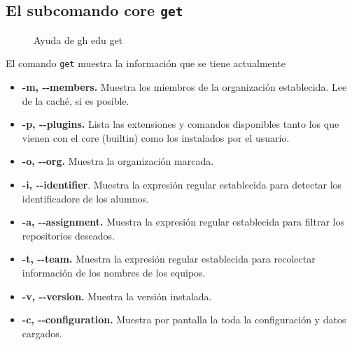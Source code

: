\subsection{El subcomando core {\tt get}}
\begin{figure}
    \centering
    \caption{Ayuda de gh edu get}
    \label{fig:ghEduGetHelp}
\end{figure}
El comando \verb|get| muestra la información que se tiene actualmente
\begin{itemize}
    \item \textbf{-m, -{}-members.} Muestra los miembros de la organización establecida. Lee de la caché, si es posible.
    \item \textbf{-p, -{}-plugins.} Lista las extensiones y comandos disponibles tanto los que vienen con el core (builtin) como los instalados por el usuario.
    \item \textbf{-o, -{}-org.} Muestra la organización marcada.
    \item \textbf{-i, -{}-identifier}. Muestra la expresión regular establecida para detectar los identificadore de los alumnos.
    \item \textbf{-a, -{}-assignment.} Muestra la expresión regular establecida para filtrar los repositorios deseados.
    \item \textbf{-t, -{}-team.} Muestra la expresión regular establecida para recolectar información de los nombres de los equipos.
    \item \textbf{-v, -{}-version.} Muestra la versión instalada.
    \item \textbf{-c, -{}-configuration.} Muestra por pantalla la toda la configuración y datos cargados.
\end{itemize}

